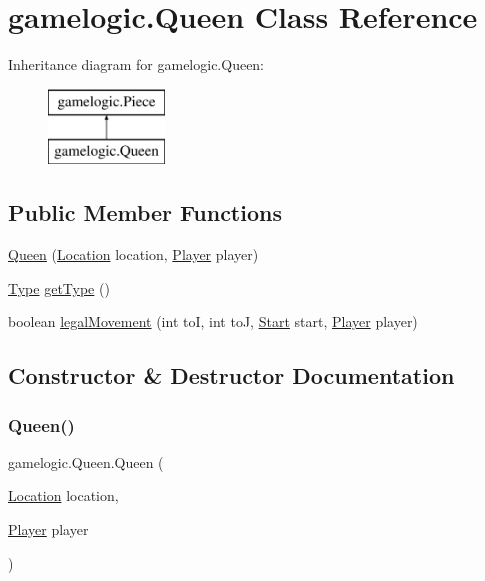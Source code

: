 \hypertarget{classgamelogic_1_1_queen}{}\section{gamelogic.\+Queen Class Reference}
\label{classgamelogic_1_1_queen}
Inheritance diagram for gamelogic.\+Queen\+:\begin{figure}[H]
\begin{center}
\leavevmode
\includegraphics[height=2.000000cm]{classgamelogic_1_1_queen}
\end{center}
\end{figure}
\subsection*{Public Member Functions}
\begin{DoxyCompactItemize}
\item 
\mbox{\hyperlink{classgamelogic_1_1_queen_a2e4423ad97041b2638a6014c2743c83b}{Queen}} (\mbox{\hyperlink{classgamelogic_1_1_location}{Location}} location, \mbox{\hyperlink{classgamelogic_1_1_player}{Player}} player)
\item 
\mbox{\hyperlink{enumgamelogic_1_1_type}{Type}} \mbox{\hyperlink{classgamelogic_1_1_queen_af017112ee1d4b62e5a47c7874c063579}{get\+Type}} ()
\item 
boolean \mbox{\hyperlink{classgamelogic_1_1_queen_ad6d18289211705f1ab8e25b1daaba3a5}{legal\+Movement}} (int toI, int toJ, \mbox{\hyperlink{classgamelogic_1_1_start}{Start}} start, \mbox{\hyperlink{classgamelogic_1_1_player}{Player}} player)
\end{DoxyCompactItemize}


\subsection{Constructor \& Destructor Documentation}
\mbox{\label{classgamelogic_1_1_queen_a2e4423ad97041b2638a6014c2743c83b}} 
\subsubsection{\texorpdfstring{Queen()}{Queen()}}
{\footnotesize\ttfamily gamelogic.\+Queen.\+Queen (\begin{DoxyParamCaption}\item[{\mbox{\hyperlink{classgamelogic_1_1_location}{Location}}}]{location,  }\item[{\mbox{\hyperlink{classgamelogic_1_1_player}{Player}}}]{player }\end{DoxyParamCaption})}

